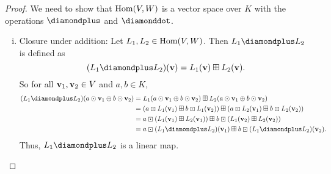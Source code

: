 \begin{proof}
    We need to show that \(\operatorname{Hom}(V, W)\) is a vector space over \(K\) with the operations \(\diamondplus\) and \(\diamonddot\).
    \begin{enumerate}[(i)]
        \item Closure under addition:
              Let \(L_1, L_2 \in \operatorname{Hom}(V, W)\). Then \(L_1 \diamondplus L_2\) is defined as
              \begin{equation}
                  (L_1 \diamondplus L_2)(\vb{v}) = L_1(\vb{v}) \boxplus L_2(\vb{v}).
              \end{equation}
              So for all \(\vb{v}_1, \vb{v}_2 \in V\) and \(a, b \in K\),
              \begin{align*}
                  (L_1 \diamondplus L_2)(a \odot \vb{v}_1 \oplus b \odot \vb{v}_2) & = L_1(a \odot \vb{v}_1 \oplus b \odot \vb{v}_2) \boxplus L_2(a \odot \vb{v}_1 \oplus b \odot \vb{v}_2)                           \\
                                                                                   & = (a \boxdot L_1(\vb{v}_1) \boxplus b \boxdot L_1(\vb{v}_2)) \boxplus (a \boxdot L_2(\vb{v}_1) \boxplus b \boxdot L_2(\vb{v}_2)) \\
                                                                                   & = a \boxdot (L_1(\vb{v}_1) \boxplus L_2(\vb{v}_1)) \boxplus b \boxdot (L_1(\vb{v}_2) \boxplus L_2(\vb{v}_2))                     \\
                                                                                   & = a \boxdot (L_1 \diamondplus L_2)(\vb{v}_1) \boxplus b \boxdot (L_1 \diamondplus L_2)(\vb{v}_2).
              \end{align*}
              Thus, \(L_1 \diamondplus L_2\) is a linear map.


\end{enumerate}
\end{proof}
